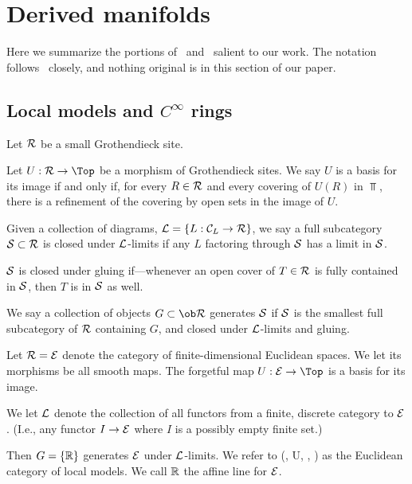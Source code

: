  
\section{Derived manifolds}

Here we summarize the portions of~\cite{spivak} and~\cite{spivak-thesis} salient to our work. The notation follows~\cite{spivak-thesis} closely, and nothing original is in this section of our paper. 


\subsection{Local models and $C^\infty$ rings}

Let $\mathcal R$ be a small Grothendieck site. 

\enum
	\item
		Let $U: \cR \to \Top$ be a morphism of Grothendieck sites. We say $U$ is a basis for its image if and only if, for every $R \in \mathcal R$ and every covering of $U(R)$ in $\Top$, there is a refinement of the covering by open sets in the image of $U$. 
	\item
		Given a collection of diagrams, $\mathcal L = \{ L: \mathcal C_L \to \mathcal R\}$, we say a full subcategory $\mathcal S \subset \mathcal R$ is closed under $\mathcal L$-limits if any $L$ factoring through $\mathcal S$ has a limit in $\mathcal S$. 
	\item
		$\mathcal S$ is closed under gluing if---whenever an open cover of $T \in \mathcal R$ is fully contained in $\mathcal S$, then $T$ is in $\mathcal S$ as well.
	\item
		We say a collection of objects $G \subset \ob \cR$ generates $\mathcal S$ if $\mathcal S$ is the smallest full subcategory of $\mathcal R$ containing $G$, and closed under $\mathcal L$-limits and gluing.
\enumd

\begin{example}
Let $\mathcal R = \mathcal E$ denote the category of finite-dimensional Euclidean spaces. We let its morphisms be all smooth maps. The forgetful map $U: \cE \to \Top$ is a basis for its image. 

We let $\mathcal L$ denote the collection of all functors from a finite, discrete category to $\mathcal E$. (I.e., any functor $I \to \mathcal E$ where $I$ is a possibly empty finite set.) 

Then $G = \{\mathbb R\}$ generates $\mathcal E$ under $\mathcal L$-limits. We refer to
	\eqnn
		(\cE, U, \cL, \RR)
	\eqnd
as the Euclidean category of local models. We call $\mathbb R$ the affine line for $\mathcal E$.
\end{example}

